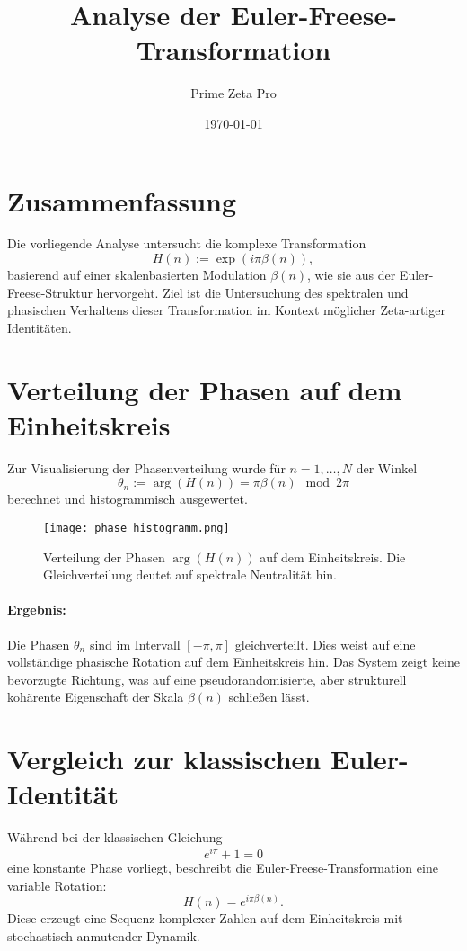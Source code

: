 \documentclass[a4paper,12pt]{article}
\title{Analyse der Euler-Freese-Transformation}
\author{Prime Zeta Pro}
\date{\today}
\begin{document}
\maketitle

\section*{Zusammenfassung}

Die vorliegende Analyse untersucht die komplexe Transformation
\[
H(n) := \exp(i \pi \beta(n)),
\]
basierend auf einer skalenbasierten Modulation \(\beta(n)\), wie sie aus der Euler-Freese-Struktur hervorgeht. Ziel ist die Untersuchung des spektralen und phasischen Verhaltens dieser Transformation im Kontext möglicher Zeta-artiger Identitäten.

\section{Verteilung der Phasen auf dem Einheitskreis}

Zur Visualisierung der Phasenverteilung wurde für \( n = 1, \dots, N \) der Winkel
\[
\theta_n := \arg(H(n)) = \pi \beta(n) \mod 2\pi
\]
berechnet und histogrammisch ausgewertet.

\begin{figure}[H]
    \centering
    \texttt{[image: phase\_histogramm.png]} %
    \caption{Verteilung der Phasen \( \arg(H(n)) \) auf dem Einheitskreis. Die Gleichverteilung deutet auf spektrale Neutralität hin.}
\end{figure}

\paragraph{Ergebnis:} Die Phasen \(\theta_n\) sind im Intervall \([-\pi, \pi]\) gleichverteilt. Dies weist auf eine vollständige phasische Rotation auf dem Einheitskreis hin. Das System zeigt keine bevorzugte Richtung, was auf eine pseudorandomisierte, aber strukturell kohärente Eigenschaft der Skala \(\beta(n)\) schließen lässt.

\section{Vergleich zur klassischen Euler-Identität}

Während bei der klassischen Gleichung
\[
e^{i\pi} + 1 = 0
\]
eine konstante Phase vorliegt, beschreibt die Euler-Freese-Transformation eine variable Rotation:
\[
H(n) = e^{i\pi\beta(n)}.
\]
Diese erzeugt eine Sequenz komplexer Zahlen auf dem Einheitskreis mit stochastisch anmutender Dynamik.
\end{document}
